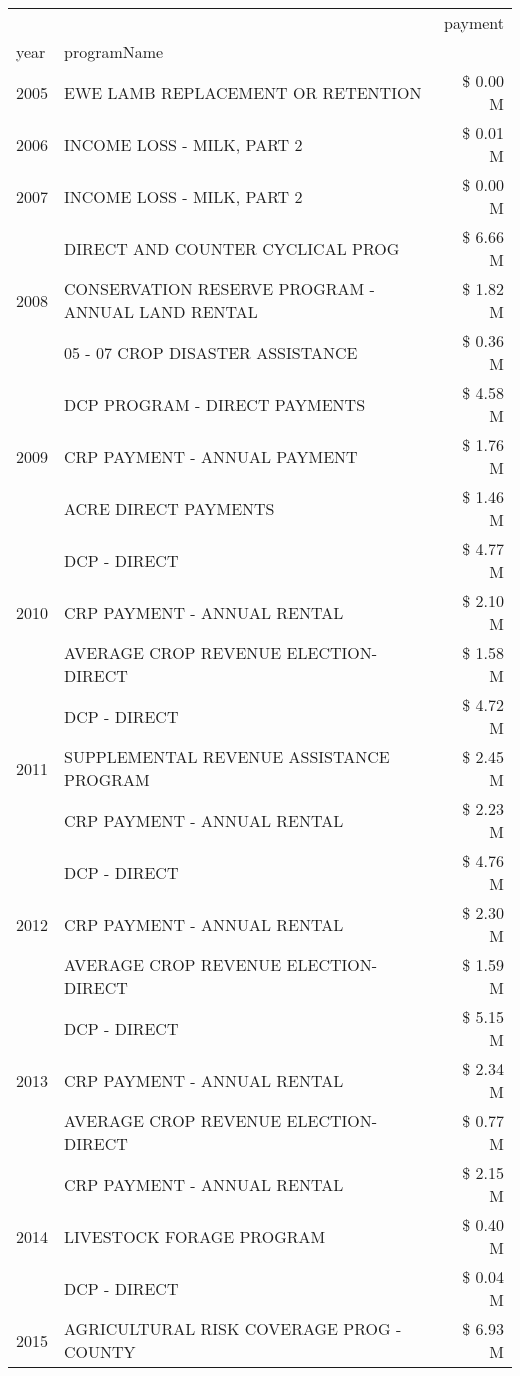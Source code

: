 \begin{tabular}{llr}
\toprule
 &  & payment \\
year & programName &  \\
\midrule
2005 & EWE LAMB REPLACEMENT OR RETENTION & \$ 0.00 M \\
\cline{1-3}
2006 & INCOME LOSS - MILK, PART 2 & \$ 0.01 M \\
\cline{1-3}
2007 & INCOME LOSS - MILK, PART 2 & \$ 0.00 M \\
\cline{1-3}
\multirow[t]{3}{*}{2008} & DIRECT AND COUNTER CYCLICAL PROG & \$ 6.66 M \\
 & CONSERVATION RESERVE PROGRAM - ANNUAL LAND RENTAL & \$ 1.82 M \\
 & 05 - 07 CROP DISASTER ASSISTANCE & \$ 0.36 M \\
\cline{1-3}
\multirow[t]{3}{*}{2009} & DCP PROGRAM - DIRECT PAYMENTS & \$ 4.58 M \\
 & CRP PAYMENT - ANNUAL PAYMENT & \$ 1.76 M \\
 & ACRE DIRECT PAYMENTS & \$ 1.46 M \\
\cline{1-3}
\multirow[t]{3}{*}{2010} & DCP - DIRECT & \$ 4.77 M \\
 & CRP PAYMENT - ANNUAL RENTAL & \$ 2.10 M \\
 & AVERAGE CROP REVENUE ELECTION-DIRECT & \$ 1.58 M \\
\cline{1-3}
\multirow[t]{3}{*}{2011} & DCP - DIRECT & \$ 4.72 M \\
 & SUPPLEMENTAL REVENUE ASSISTANCE PROGRAM & \$ 2.45 M \\
 & CRP PAYMENT - ANNUAL RENTAL & \$ 2.23 M \\
\cline{1-3}
\multirow[t]{3}{*}{2012} & DCP - DIRECT & \$ 4.76 M \\
 & CRP PAYMENT - ANNUAL RENTAL & \$ 2.30 M \\
 & AVERAGE CROP REVENUE ELECTION-DIRECT & \$ 1.59 M \\
\cline{1-3}
\multirow[t]{3}{*}{2013} & DCP - DIRECT & \$ 5.15 M \\
 & CRP PAYMENT - ANNUAL RENTAL & \$ 2.34 M \\
 & AVERAGE CROP REVENUE ELECTION-DIRECT & \$ 0.77 M \\
\cline{1-3}
\multirow[t]{3}{*}{2014} & CRP PAYMENT - ANNUAL RENTAL & \$ 2.15 M \\
 & LIVESTOCK FORAGE PROGRAM & \$ 0.40 M \\
 & DCP - DIRECT & \$ 0.04 M \\
\cline{1-3}
\multirow[t]{3}{*}{2015} & AGRICULTURAL RISK COVERAGE PROG - COUNTY & \$ 6.93 M \\

\end{tabular}
